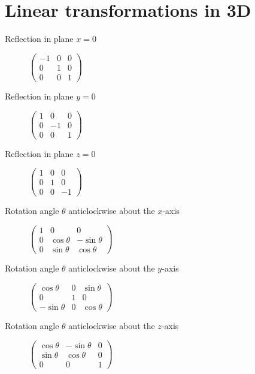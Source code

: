 \section{Linear transformations in 3D}
\begin{description}
    \item[Reflection in plane $x=0$] $\begin{pmatrix}
                  -1 & 0 & 0 \\
                  0  & 1 & 0 \\
                  0  & 0 & 1
              \end{pmatrix}$
    \item[Reflection in plane $y=0$] $\begin{pmatrix}
                  1 & 0  & 0 \\
                  0 & -1 & 0 \\
                  0 & 0  & 1
              \end{pmatrix}$
    \item[Reflection in plane $z=0$] $\begin{pmatrix}
                  1 & 0 & 0  \\
                  0 & 1 & 0  \\
                  0 & 0 & -1
              \end{pmatrix}$
    \item[Rotation angle $\theta$ anticlockwise about the $x$-axis] $\begin{pmatrix}
                  1 & 0          & 0           \\
                  0 & \cos\theta & -\sin\theta \\
                  0 & \sin\theta & \cos\theta
              \end{pmatrix}$
    \item[Rotation angle $\theta$ anticlockwise about the $y$-axis] $\begin{pmatrix}
                  \cos\theta  & 0 & \sin\theta \\
                  0           & 1 & 0          \\
                  -\sin\theta & 0 & \cos\theta
              \end{pmatrix}$
    \item[Rotation angle $\theta$ anticlockwise about the $z$-axis] $\begin{pmatrix}
                  \cos\theta & -\sin\theta & 0 \\
                  \sin\theta & \cos\theta  & 0 \\
                  0          & 0           & 1
              \end{pmatrix}$
\end{description}




